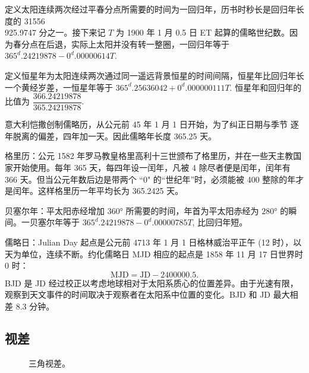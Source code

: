 \documentclass[UTF8, 12pt, a4paper, oneside, onecolumn, fontset=none]{ctexart}
\begin{document}
定义太阳连续两次经过平春分点所需要的时间为一回归年，历书时秒长是回归年长度的 31556\\925.9747 分之一。接下来记 $T$ 为 1900 年 1 月 0.5 日 ET 起算的儒略世纪数。因为春分点在后退，实际上太阳并没有转一整圈，一回归年等于 $365^{\unit{d}}.24219878-0^{\unit{d}}.00000614T$.

定义恒星年为太阳连续两次通过同一遥远背景恒星的时间间隔，恒星年比回归年长一个黄经岁差，一恒星年等于 $365^{\unit{d}}.25636042+0^{\unit{d}}.000000111T$. 恒星年和回归年的比值为 $\dfrac{366.24219878}{365.24219878}$.

意大利恺撒创制儒略历，从公元前 45 年 1 月 1 日开始，为了纠正日期与季节
逐年脱离的偏差，四年加一天。因此儒略年长度 365.25 天。

格里历：公元 1582 年罗马教皇格里高利十三世颁布了格里历，并在一些天主教国家开始使用。每年 365 天，每四年设一闰年，凡被 4 除尽者便是闰年，闰年有 366 天。但当公元年数后边是带两个 ``0" 的“世纪年”时，必须能被 400 整除的年才是闰年。这样格里历一年平均长为 365.2425 天。

贝塞尔年：平太阳赤经增加 $\ang{360;;}$ 所需要的时间，年首为平太阳赤经为 $\ang{280;;}$ 的瞬间。一贝塞尔年等于 $365^{\unit{d}}.24219878-0^{\unit{d}}.00000785T$, 比回归年短。

儒略日：Julian Day 起点是公元前 4713 年 1 月 1 日格林威治平正午 (12 时），以天为单位，连续不断。约化儒略日 MJD 相应的起点是 1858 年 11 月 17 日世界时 0 时：
\begin{equation}
\mathrm{MJD}=\mathrm{JD}-2400000.5.
\end{equation}
BJD 是 JD 经过校正以考虑地球相对于太阳系质心的位置差异。由于光速有限，观察到天文事件的时间取决于观察者在太阳系中位置的变化。BJD 和 JD 最大相差 8.3 分钟。

\subsection{视差}
\begin{figure}[!htp]
\centering
{}
\captionsetup{justification=raggedright, singlelinecheck=false}
\caption{三角视差。}
\label{三角视差。}
\end{figure}
\end{document}
